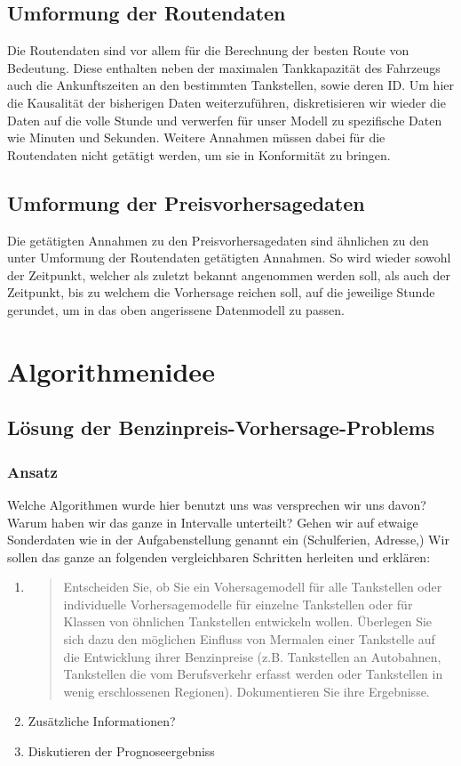 \documentclass[11pt]{article}
\begin{document}
\subsection{Umformung der Routendaten}
	Die Routendaten sind vor allem für die Berechnung der besten Route von Bedeutung. Diese enthalten neben der maximalen Tankkapazität des Fahrzeugs auch die Ankunftszeiten an den bestimmten Tankstellen, sowie deren ID. Um hier die Kausalität der bisherigen Daten weiterzuführen, diskretisieren wir wieder die Daten auf die volle Stunde und verwerfen für unser Modell zu spezifische  Daten wie Minuten und Sekunden. Weitere Annahmen müssen dabei für die Routendaten nicht getätigt werden, um sie in Konformität zu bringen.
\subsection{Umformung der Preisvorhersagedaten}
	Die getätigten Annahmen zu den Preisvorhersagedaten sind ähnlichen zu den unter \glqq Umformung der Routendaten\grqq{} getätigten Annahmen. So wird wieder sowohl der Zeitpunkt, welcher als zuletzt bekannt angenommen werden soll, als auch der Zeitpunkt, bis zu welchem die Vorhersage reichen soll, auf die jeweilige Stunde gerundet, um in das oben angerissene Datenmodell zu passen.

\section{Algorithmenidee}
\subsection{Lösung der Benzinpreis-Vorhersage-Problems}
\subsubsection{Ansatz}
	Welche Algorithmen wurde hier benutzt uns was versprechen wir uns davon? Warum haben wir das ganze in Intervalle unterteilt? Gehen wir auf etwaige Sonderdaten wie in der Aufgabenstellung genannt ein (Schulferien, Adresse,) 
	\newline
	\newline
	Wir sollen das ganze an folgenden vergleichbaren Schritten herleiten und erklären:
	\begin{enumerate}
		\item \begin{quote}
			Entscheiden Sie, ob Sie ein Vohersagemodell für alle Tankstellen oder individuelle Vorhersagemodelle für einzelne Tankstellen oder für Klassen von öhnlichen Tankstellen entwickeln wollen. Überlegen Sie sich dazu den möglichen Einfluss von Mermalen einer Tankstelle auf die Entwicklung ihrer Benzinpreise (z.B. Tankstellen an Autobahnen, Tankstellen die vom Berufsverkehr erfasst werden oder Tankstellen in wenig erschlossenen Regionen). Dokumentieren Sie ihre Ergebnisse.
		\end{quote}
		\item Zusätzliche Informationen?
		\item Diskutieren der Prognoseergebniss
	\end{enumerate}
	
\end{document}
